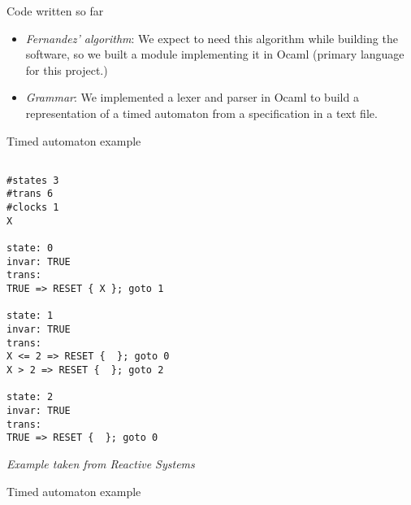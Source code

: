 \documentclass{beamer}
\begin{document}
\begin{frame}{Code written so far}

  \begin{itemize}

    \item \emph{Fernandez' algorithm}: We expect to need this
      algorithm while building the software, so we built a module
      implementing it in Ocaml (primary language for this project.)

    \item \emph{Grammar}: We implemented a lexer and parser in Ocaml
      to build a representation of a timed automaton from a
      specification in a text file.

  \end{itemize}

\end{frame}

\begin{frame}{Timed automaton example}

\begin{verbatim}

#states 3
#trans 6
#clocks 1
X

state: 0
invar: TRUE
trans:
TRUE => RESET { X }; goto 1

state: 1
invar: TRUE
trans:
X <= 2 => RESET {  }; goto 0
X > 2 => RESET {  }; goto 2

state: 2
invar: TRUE
trans:
TRUE => RESET {  }; goto 0

\end{verbatim}

\textit{Example taken from Reactive Systems}

\end{frame}

\begin{frame}{Timed automaton example}

  
\end{frame}
\end{document}
